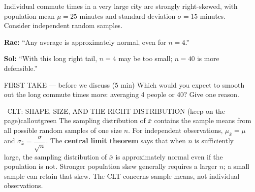 \documentclass[11pt]{article}
\begin{document}


Individual commute times in a very large city are strongly right-skewed, with population mean $\mu=25$ minutes and standard deviation $\sigma=15$ minutes. Consider independent random samples.\par\smallskip \textbf{Rae:} ``Any average is approximately normal, even for $n=4$.''\par \textbf{Sol:} ``With this long right tail, $n=4$ may be too small; $n=40$ is more defensible.''\par
\begin{center}
\end{center}
\begin{firsttakebox}{FIRST TAKE --- before we discuss (5 min)}
Which would you expect to smooth out the long commute times more: averaging 4 people or 40? Give one reason.
\workspace{0.9in}
\end{firsttakebox}

\begin{callout}{\IconBook\ CLT: SHAPE, SIZE, AND THE RIGHT DISTRIBUTION (keep on the page)}{calloutgreen}
The sampling distribution of $\bar{x}$ contains the sample means from all possible random samples of one size $n$.
For independent observations, $\mu_{\bar{x}}=\mu$ and $\sigma_{\bar{x}}=\dfrac{\sigma}{\sqrt{n}}$.
The \textbf{central limit theorem} says that when $n$ is sufficiently large, the sampling distribution of
$\bar{x}$ is approximately normal even if the population is not. Stronger population skew generally requires
a larger $n$; a small sample can retain that skew. The CLT concerns sample means, not individual observations.
\end{callout}
\end{document}
